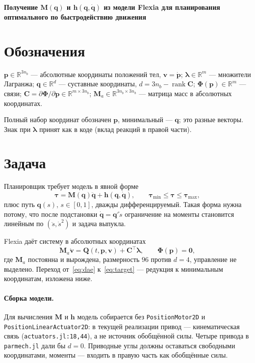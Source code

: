 \documentclass[11pt,a4paper]{article}
\newcommand{\bp}{\mathbf{p}}
\newcommand{\bq}{\mathbf{q}}
\newcommand{\bv}{\mathbf{v}}
\newcommand{\bC}{\mathbf{C}}
\newcommand{\bM}{\mathbf{M}}
\newcommand{\bQ}{\mathbf{Q}}
\newcommand{\bh}{\mathbf{h}}
\newcommand{\bzero}{\mathbf{0}}
\newcommand{\bPhi}{\boldsymbol{\Phi}}
\newcommand{\blam}{\boldsymbol{\lambda}}
\newcommand{\btau}{\boldsymbol{\tau}}
\newcommand{\Ma}{\bM_{a}}
\newcommand{\tr}{^{\!\top}}
\newcommand{\code}[1]{\texttt{#1}}
\begin{document}
\begin{center}
{\large\bfseries Получение $\bM(\bq)$ и $\bh(\bq,\dot{\bq})$ из модели Flexia для планирования\\
оптимального по быстродействию движения}
\end{center}

\bigskip

\section*{Обозначения}

$\bp\in\mathbb R^{3n_b}$ --- абсолютные координаты положений тел,
$\bv=\dot{\bp}$;
$\blam\in\mathbb R^{m}$ --- множители Лагранжа;
$\bq\in\mathbb R^{d}$ --- суставные координаты, $d=3n_b-\operatorname{rank}\bC$;
$\bPhi(\bp)\in\mathbb R^{m}$ --- связи;
$\bC=\partial\bPhi/\partial\bp\in\mathbb R^{m\times3n_b}$;
$\Ma\in\mathbb R^{3n_b\times3n_b}$ --- матрица масс в абсолютных координатах.

Полный набор координат обозначен $\bp$, минимальный --- $\bq$; это разные
векторы. Знак при $\blam$ принят как в коде (вклад реакций в правой части).

\section{Задача}

Планировщик требует модель в явной форме
\begin{equation}
\btau=\bM(\bq)\ddot{\bq}+\bh(\bq,\dot{\bq}),
\qquad \btau_{\min}\le\btau\le\btau_{\max},
\label{eq:target}
\end{equation}
плюс путь $\bq(s)$, $s\in[0,1]$, дважды дифференцируемый. Такая форма нужна
потому, что после подстановки $\dot{\bq}=\bq'\dot s$ ограничение на моменты
становится линейным по $(\ddot s,\dot s^{2})$ и задача выпукла.

Flexia даёт систему в абсолютных координатах
\begin{equation}
\Ma\dot{\bv}=\bQ(t,\bp,\bv)+\bC\tr\blam,
\qquad
\bPhi(\bp)=\bzero,
\label{eq:dae}
\end{equation}
где $\bM_a$ постоянна и вырождена, размерность $96$ против $d=4$, управление
не выделено. Переход от~\eqref{eq:dae} к~\eqref{eq:target} --- редукция к
минимальным координатам, изложена ниже.

\paragraph{Сборка модели.} Для вычисления $\bM$ и $\bh$ модель собирается без
\code{PositionMotor2D} и \code{PositionLinearActuator2D}: в текущей
реализации привод --- кинематическая связь (\code{actuators.jl:18,44}), а не
источник обобщённой силы. Четыре привода в \code{parmech.jl} дали бы $d=0$.
Приводные углы должны оставаться свободными координатами, моменты --- входить
в правую часть как обобщённые силы.
\end{document}
